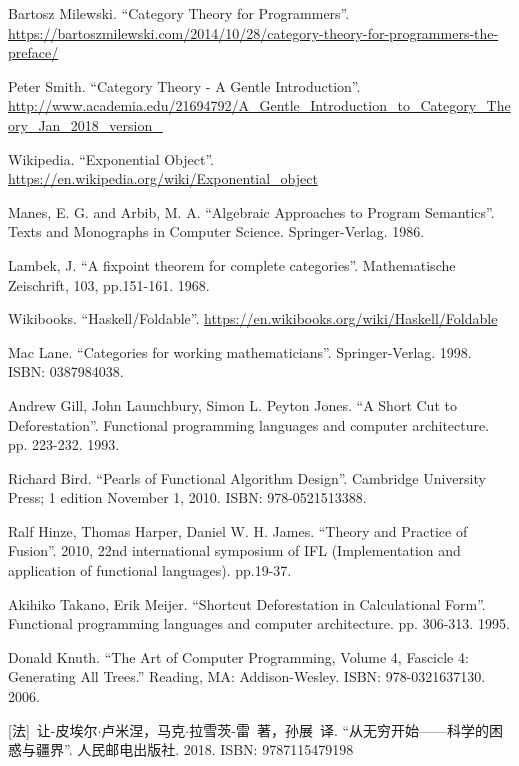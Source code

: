 \documentclass[UTF8]{article}
\begin{document}
\begin{thebibliography}{99}
Bartosz Milewski. ``Category Theory for Programmers''. \url{https://bartoszmilewski.com/2014/10/28/category-theory-for-programmers-the-preface/}

Peter Smith. ``Category Theory - A Gentle Introduction''. \url{http://www.academia.edu/21694792/A_Gentle_Introduction_to_Category_Theory_Jan_2018_version_}

Wikipedia. ``Exponential Object''. \url{https://en.wikipedia.org/wiki/Exponential_object}

Manes, E. G. and Arbib, M. A. ``Algebraic Approaches to Program Semantics''. Texts and Monographs in Computer Science. Springer-Verlag. 1986.

Lambek, J. ``A fixpoint theorem for complete categories''. Mathematische Zeischrift, 103, pp.151-161. 1968.

Wikibooks. ``Haskell/Foldable''. \url{https://en.wikibooks.org/wiki/Haskell/Foldable}

Mac Lane. ``Categories for working mathematicians''. Springer-Verlag. 1998. ISBN: 0387984038.


Andrew Gill, John Launchbury, Simon L. Peyton Jones. ``A Short Cut to Deforestation''. Functional programming languages and computer architecture. pp. 223-232. 1993.

Richard Bird. ``Pearls of Functional Algorithm Design''. Cambridge University Press; 1 edition November 1, 2010. ISBN: 978-0521513388.

Ralf Hinze, Thomas Harper, Daniel W. H. James. ``Theory and Practice of Fusion''. 2010, 22nd international symposium of IFL (Implementation and application of functional languages). pp.19-37.

Akihiko Takano, Erik Meijer. ``Shortcut Deforestation in Calculational Form''. Functional programming languages and computer architecture. pp. 306-313. 1995.

Donald Knuth. ``The Art of Computer Programming, Volume 4, Fascicle 4: Generating All Trees.'' Reading, MA: Addison-Wesley. ISBN: 978-0321637130. 2006.

[法]\ 让-皮埃尔$\cdot$卢米涅，马克$\cdot$拉雪茨-雷\ 著，孙展\ 译. ``从无穷开始——科学的困惑与疆界''. 人民邮电出版社. 2018. ISBN: 9787115479198


\end{thebibliography}
\end{document}
